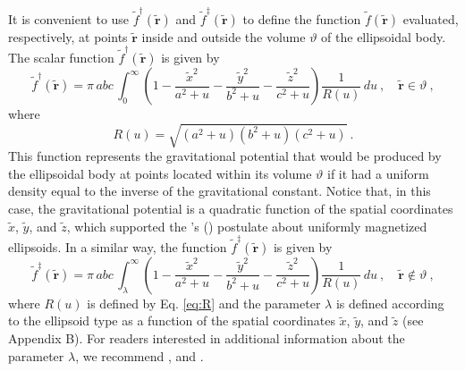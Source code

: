 \documentclass[gmd, manuscript]{copernicus}
\begin{document}
It is convenient to use $\tilde{f}^{\dagger}(\tilde{\mathbf{r}})$
and $\tilde{f}^{\ddagger}(\tilde{\mathbf{r}})$ to define
the function $\tilde{f}(\tilde{\mathbf{r}})$ evaluated,
respectively, at points
$\tilde{\mathbf{r}}$ inside and outside the volume $\vartheta$ of the
ellipsoidal body.
The scalar function $\tilde{f}^{\dagger}(\tilde{\mathbf{r}})$
is given by
\begin{equation}
\tilde{f}^{\dagger}(\tilde{\mathbf{r}}) = \pi \, abc \,
\int_{0}^{\infty} \left( 1
- \frac{\tilde{x}^{2}}{a^{2} + u}
- \frac{\tilde{y}^{2}}{b^{2} + u}
- \frac{\tilde{z}^{2}}{c^{2} + u} \right)
\frac{1}{R(u)} \, du \: , \quad \tilde{\mathbf{r}} \in \vartheta \: ,
\label{eq:fi-tilde}
\end{equation}
where
\begin{equation}
R(u) = \sqrt{\left( a^{2} + u \right)\left( b^{2} + u \right)\left( c^{2} + u \right)} \: .
\label{eq:R}
\end{equation}
This function represents the gravitational potential
that would be produced by the ellipsoidal body at
points located within its volume $\vartheta$ if it
had a uniform density equal to the inverse of the
gravitational constant.
Notice that, in this case, the gravitational potential
is a quadratic function of the spatial coordinates
$\tilde{x}$, $\tilde{y}$, and $\tilde{z}$, which
supported the \citeauthor{maxwell1873}'s (\citeyear{maxwell1873})
postulate about uniformly magnetized ellipsoids.
In a similar way, the function $\tilde{f}^{\ddagger}(\tilde{\mathbf{r}})$
is given by
\begin{equation}
\tilde{f}^{\ddagger}(\tilde{\mathbf{r}}) = \pi \, abc \,
\int_{\lambda}^{\infty} \left( 1
- \frac{\tilde{x}^{2}}{a^{2} + u}
- \frac{\tilde{y}^{2}}{b^{2} + u}
- \frac{\tilde{z}^{2}}{c^{2} + u} \right)
\frac{1}{R(u)} \, du \: , \quad \tilde{\mathbf{r}} \not\in \vartheta \: ,
\label{eq:fe-tilde}
\end{equation}
where $R(u)$ is defined by Eq. \ref{eq:R} and the
parameter $\lambda$ is defined according to the
ellipsoid type as a function of the spatial coordinates
 $\tilde{x}$, $\tilde{y}$, and $\tilde{z}$ (see Appendix B).
For readers interested in additional information about the
parameter $\lambda$, we recommend \citet[p.~234]{webster1904},
\citet[p.~184]{kellogg1929} and \citet{clark1986}.
\end{document}
